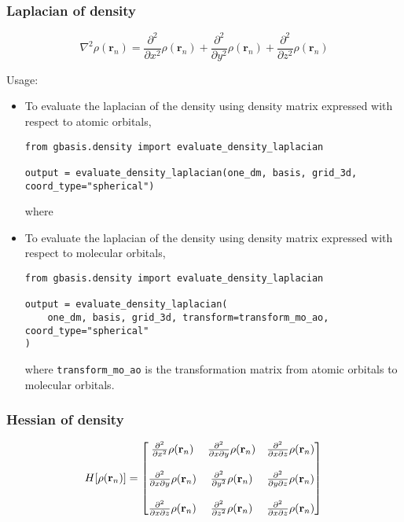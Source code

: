 \documentclass[letterpaper]{article}
\begin{document}
\subsubsection{Laplacian of density}
\begin{equation}
  \nabla^2 \rho(\mathbf{r}_n)
  =
  \frac{\partial^2}{\partial x^2} \rho(\mathbf{r}_n)
  + \frac{\partial^2}{\partial y^2} \rho(\mathbf{r}_n)
  + \frac{\partial^2}{\partial z^2} \rho(\mathbf{r}_n)
\end{equation}

Usage:
\begin{itemize}
\item To evaluate the laplacian of the density using density matrix expressed
  with respect to atomic orbitals,
\begin{verbatim}
from gbasis.density import evaluate_density_laplacian

output = evaluate_density_laplacian(one_dm, basis, grid_3d, coord_type="spherical")
\end{verbatim}
  where
\item To evaluate the laplacian of the density using density matrix expressed
  with respect to molecular orbitals,
\begin{verbatim}
from gbasis.density import evaluate_density_laplacian

output = evaluate_density_laplacian(
    one_dm, basis, grid_3d, transform=transform_mo_ao, coord_type="spherical"
)
\end{verbatim}
  where
  \verb|transform_mo_ao| is the transformation matrix from atomic orbitals
  to molecular orbitals.
\end{itemize}
\subsubsection{Hessian of density}
\begin{equation}
  H[\rho(\mathbf{r}_n)]
  =
  \begin{bmatrix}
    \frac{\partial^2}{\partial x^2} \rho(\mathbf{r}_n) &
    \frac{\partial^2}{\partial x \partial y} \rho(\mathbf{r}_n) &
    \frac{\partial^2}{\partial x \partial z} \rho(\mathbf{r}_n)\\\\
    \frac{\partial^2}{\partial x \partial y} \rho(\mathbf{r}_n) &
    \frac{\partial^2}{\partial y^2} \rho(\mathbf{r}_n)&
    \frac{\partial^2}{\partial y \partial z} \rho(\mathbf{r}_n)\\\\
    \frac{\partial^2}{\partial x \partial z} \rho(\mathbf{r}_n) &
    \frac{\partial^2}{\partial z^2} \rho(\mathbf{r}_n)&
    \frac{\partial^2}{\partial x \partial z} \rho(\mathbf{r}_n)\\
  \end{bmatrix}\\
\end{equation}
\end{document}
